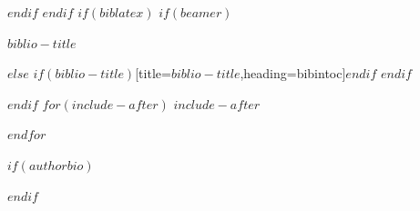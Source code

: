\documentclass[
$if(fontsize)$
  $fontsize$,
$endif$
$if(lang)$
  $babel-lang$,
$endif$
$if(papersize)$
  $papersize$paper,
$endif$
$if(beamer)$
  ignorenonframetext,
$if(handout)$
  handout,
$endif$
$if(aspectratio)$
  aspectratio=$aspectratio$,
$endif$
$endif$
$for(classoption)$
  $classoption$$sep$,
$endfor$
]{$documentclass$}
\newif\ifbibliography
\begin{document}
$endif$
$endif$
$if(biblatex)$
$if(beamer)$
\begin{frame}[allowframebreaks]{$biblio-title$}
  \bibliographytrue
  \printbibliography[heading=none]
\end{frame}
$else$
\begingroup
\printbibliography$if(biblio-title)$[title=$biblio-title$,heading=bibintoc]$endif$
\endgroup
$endif$

$endif$
$for(include-after)$
$include-after$

$endfor$

\printindex

\clearpage{\thispagestyle{empty}\cleardoublepage}

$if(authorbio)$
\pagestyle{empty}

$endif$


\end{document}
